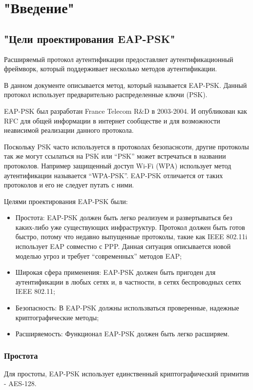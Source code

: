 \section{"Введение"}

\subsection{"Цели проектирования EAP-PSK"}

Расширяемый протокол аутентификации предоставляет аутентификационный фреймворк, который поддерживает несколько методов аутентификации.

В данном документе описывается метод, который называется EAP-PSK. Данный протокол использует предварительно распределенные ключи (PSK).

EAP-PSK был разработан France Telecom R\&D в 2003-2004. И опубликован как RFC для общей информации в интернет сообществе и для возможности неависимой реализации данного протокола.

Поскольку PSK часто используется в протоколах безопаснсоти, другие протоколы так же могут ссылаться на PSK или ``PSK'' может встречаться в названии протоколов. Например защищенный доступ Wi-Fi (WPA) использует метод аутентификации называется ``WPA-PSK''. EAP-PSK отличается от таких протоколов и его не следует путать с ними.

Целями проектирования EAP-PSK были:
\begin{itemize}
\item Простота: EAP-PSK должен быть легко реализуем и развертываться без каких-либо уже существующих инфраструктур. Протокол должен быть готов быстро, потому что недавно выпущенные протоколы, такие как IEEE 802.11i использует EAP совместно с PPP. Данная ситуация описывается новой моделью угроз и требует ``современных'' методов EAP;
\item Широкая сфера применения: EAP-PSK должен быть пригоден для аутентификации в любых сетях и, в частности, в сетях беспроводных сетях IEEE 802.11;
\item Безопасность: В EAP-PSK должны использваться проверенные, надежные криптографические методы;
\item Расширяемость: Функционал EAP-PSK должен быть легко расширяем.
\end{itemize}

\subsubsection{Простота}
Для простоты, EAP-PSK использует единственный криптографический примитив - AES-128.

